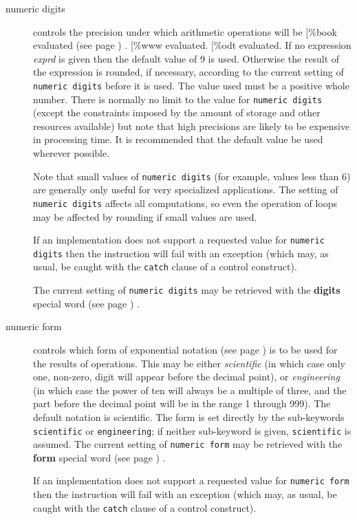 \begin{description}
\item[numeric digits]\label{refndigits}

controls the precision under which arithmetic operations will be
[\%book
 evaluated (see page \pageref{refndi2}) .
[\%www
evaluated.
[\%odt
evaluated.
If no expression \emph{exprd} is given then the default value of 9
is used.
Otherwise the result of the expression is rounded, if necessary,
according to the current setting of \texttt{numeric digits} before it is
used.
The value used must be a positive whole number.
 There is normally no limit to the value for \texttt{numeric digits}
(except the constraints imposed by the amount of storage and other
resources available) but note that high precisions are likely to be
expensive in processing time.
It is recommended that the default value be used wherever possible.
 
Note that small values of \texttt{numeric digits} (for example, values
less than 6) are generally only useful for very specialized applications.
The setting of \texttt{numeric digits} affects all computations, so even
the operation of loops may be affected by rounding if small values are
used.
 
If an implementation does not support a requested value for \texttt{numeric
digits} then the instruction will fail with an exception (which may,
as usual, be caught with the \texttt{catch} clause of a control
construct).
 
The current setting of \texttt{numeric digits} may be retrieved with the
 \textbf{digits} special word (see page \pageref{refswdigit}) .
\item[numeric form]\label{refnform}

controls which form of  exponential notation (see page \pageref{refnfo2})  is to
be used for the results of operations.
This may be either \emph{scientific} (in which case only one,
non-zero, digit will appear before the decimal point), or
\emph{engineering} (in which case the power of ten will always be a
multiple of three, and the part before the decimal point will be in the
range 1 through 999).
The default notation is scientific.
 The form is set directly by the sub-keywords \texttt{scientific} or
\texttt{engineering}; if neither sub-keyword is given,
\texttt{scientific} is assumed.
The current setting of \texttt{numeric form} may be retrieved with the
 \textbf{form} special word (see page \pageref{refswform}) .
 
If an implementation does not support a requested value for \texttt{numeric
form} then the instruction will fail with an exception (which may,
as usual, be caught with the \texttt{catch} clause of a control
construct).
\end{description}
 

